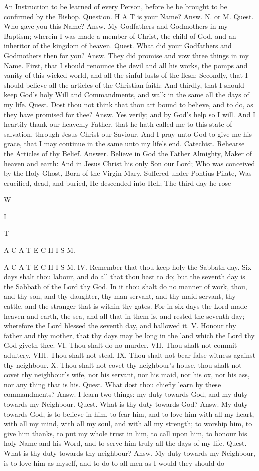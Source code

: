 An Instruction to be learned of every Person, before he be brought to be confirmed by the Bishop. Question. H A T is your Name? Answ. N. or M. Quest. Who gave you this Name? Answ. My Godfathers and Godmothers in my Baptism; wherein I was made a member of Christ, the child of God, and an inheritor of the kingdom of heaven. Quest. What did your Godfathers and Godmothers then for you? Answ. They did promise and vow three things in my Name. First, that I should renounce the devil and all his works, the pomps and vanity of this wicked world, and all the sinful lusts of the flesh: Secondly, that I should believe all the articles of the Christian faith: And thirdly, that I should keep God’s holy Will and Commandments, and walk in the same all the days of my life. Quest. Dost thou not think that thou art bound to believe, and to do, as they have promised for thee? Answ. Yes verily; and by God’s help so I will. And I heartily thank our heavenly Father, that he hath called me to this state of salvation, through Jesus Christ our Saviour. And I pray unto God to give me his grace, that I may continue in the same unto my life’s end. Catechist. Rehearse the Articles of thy Belief. Answer. Believe in God the Father Almighty, Maker of heaven and earth: And in Jesus Christ his only Son our Lord; Who was conceived by the Holy Ghost, Born of the Virgin Mary, Suffered under Pontius Pilate, Was crucified, dead, and buried, He descended into Hell; The third day he rose

W

I

T

A C A T E C H I S M.

A C A T E C H I S M. IV. Remember that thou keep holy the Sabbath day. Six days shalt thou labour, and do all that thou hast to do; but the seventh day is the Sabbath of the Lord thy God. In it thou shalt do no manner of work, thou, and thy son, and thy daughter, thy man-servant, and thy maid-servant, thy cattle, and the stranger that is within thy gates. For in six days the Lord made heaven and earth, the sea, and all that in them is, and rested the seventh day; wherefore the Lord blessed the seventh day, and hallowed it. V. Honour thy father and thy mother, that thy days may be long in the land which the Lord thy God giveth thee. VI. Thou shalt do no murder. VII. Thou shalt not commit adultery. VIII. Thou shalt not steal. IX. Thou shalt not bear false witness against thy neighbour. X. Thou shalt not covet thy neighbour’s house, thou shalt not covet thy neighbour’s wife, nor his servant, nor his maid, nor his ox, nor his ass, nor any thing that is his. Quest. What dost thou chiefly learn by these commandments? Answ. I learn two things: my duty towards God, and my duty towards my Neighbour. Quest. What is thy duty towards God? Answ. My duty towards God, is to believe in him, to fear him, and to love him with all my heart, with all my mind, with all my soul, and with all my strength; to worship him, to give him thanks, to put my whole trust in him, to call upon him, to honour his holy Name and his Word, and to serve him truly all the days of my life. Quest. What is thy duty towards thy neighbour? Answ. My duty towards my Neighbour, is to love him as myself, and to do to all men as I would they should do

